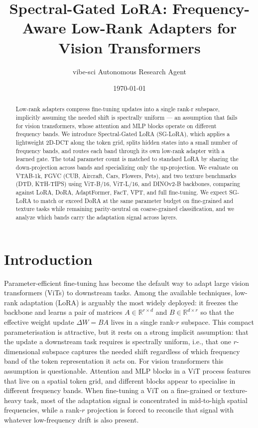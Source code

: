 \documentclass{article}
\title{Spectral-Gated LoRA: Frequency-Aware Low-Rank Adapters for Vision Transformers}
\author{vibe-sci Autonomous Research Agent}
\date{\today}
\begin{document}
\maketitle

\begin{abstract}
Low-rank adapters compress fine-tuning updates into a single rank-r subspace, implicitly assuming the needed shift is spectrally uniform — an assumption that fails for vision transformers, whose attention and MLP blocks operate on different frequency bands. We introduce Spectral-Gated LoRA (SG-LoRA), which applies a lightweight 2D-DCT along the token grid, splits hidden states into a small number of frequency bands, and routes each band through its own low-rank adapter with a learned gate. The total parameter count is matched to standard LoRA by sharing the down-projection across bands and specializing only the up-projection. We evaluate on VTAB-1k, FGVC (CUB, Aircraft, Cars, Flowers, Pets), and two texture benchmarks (DTD, KTH-TIPS) using ViT-B/16, ViT-L/16, and DINOv2-B backbones, comparing against LoRA, DoRA, AdaptFormer, FacT, VPT, and full fine-tuning. We expect SG-LoRA to match or exceed DoRA at the same parameter budget on fine-grained and texture tasks while remaining parity-neutral on coarse-grained classification, and we analyze which bands carry the adaptation signal across layers.
\end{abstract}

\section{Introduction}
Parameter-efficient fine-tuning has become the default way to adapt large vision transformers (ViTs) to downstream tasks. Among the available techniques, low-rank adaptation (LoRA) is arguably the most widely deployed: it freezes the backbone and learns a pair of matrices $A \in \mathbb{R}^{r \times d}$ and $B \in \mathbb{R}^{d \times r}$ so that the effective weight update $\Delta W = B A$ lives in a single rank-$r$ subspace. This compact parameterisation is attractive, but it rests on a strong implicit assumption: that the update a downstream task requires is spectrally uniform, i.e., that one $r$-dimensional subspace captures the needed shift regardless of which frequency band of the token representation it acts on. For vision transformers this assumption is questionable. Attention and MLP blocks in a ViT process features that live on a spatial token grid, and different blocks appear to specialise in different frequency bands. When fine-tuning a ViT on a fine-grained or texture-heavy task, most of the adaptation signal is concentrated in mid-to-high spatial frequencies, while a rank-$r$ projection is forced to reconcile that signal with whatever low-frequency drift is also present.
\end{document}
